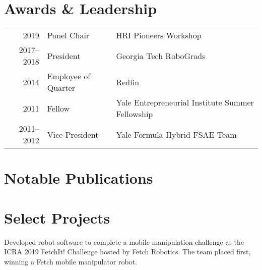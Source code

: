 \documentclass[]{deedy-resume}
\begin{document}
\begin{minipage}[t]{0.66\textwidth}


\section{Awards \& Leadership}
\begin{tabular}{rll}
2019 & Panel Chair & HRI Pioneers Workshop \\
2017--2018 & President & Georgia Tech RoboGrads \\
2014 & Employee of Quarter & Redfin \\
2011 & Fellow & Yale Entrepreneurial Institute Summer Fellowship \\
2011--2012 & Vice-President & Yale Formula Hybrid FSAE Team
\end{tabular}
\sectionsep


\section{Notable Publications}
\renewcommand\refname{\vskip -0.8cm} %


\nocite{*}


\section{Select Projects}
Developed robot software to complete a mobile manipulation challenge at the ICRA 2019 FetchIt! Challenge hosted by Fetch Robotics. The team placed first, winning a Fetch mobile manipulator robot.
\sectionsep


\end{minipage}
\end{document}
